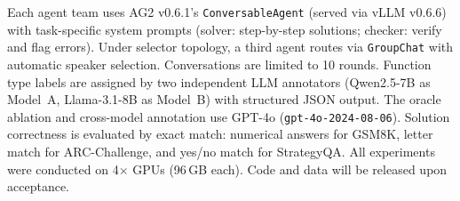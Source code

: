 Each agent team uses AG2 v0.6.1's \texttt{ConversableAgent} (served via vLLM v0.6.6) with task-specific system prompts (solver: step-by-step solutions; checker: verify and flag errors). Under selector topology, a third agent routes via \texttt{GroupChat} with automatic speaker selection. Conversations are limited to 10 rounds. Function type labels are assigned by two independent LLM annotators (Qwen2.5-7B as Model~A, Llama-3.1-8B as Model~B) with structured JSON output. The oracle ablation and cross-model annotation use GPT-4o (\texttt{gpt-4o-2024-08-06}). Solution correctness is evaluated by exact match: numerical answers for GSM8K, letter match for ARC-Challenge, and yes/no match for StrategyQA. All experiments were conducted on 4$\times$ GPUs (96\,GB each). Code and data will be released upon acceptance.
